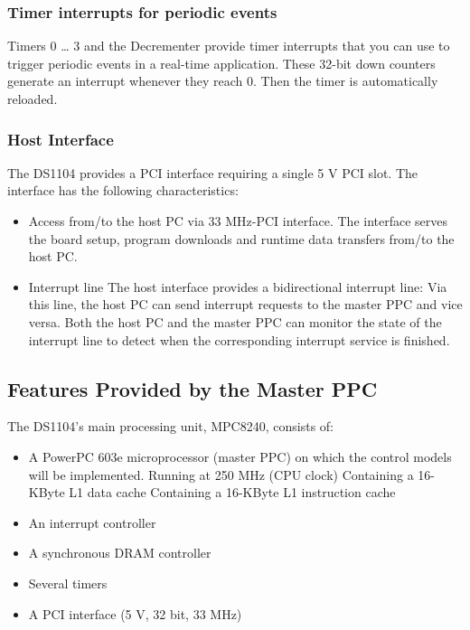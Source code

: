

\subsubsection {Timer interrupts for periodic events}
Timers 0 … 3 and the Decrementer provide timer interrupts that you can use to trigger periodic events in a real-time application. These 32-bit down counters generate an interrupt whenever they reach 0. Then the timer is automatically reloaded.

\subsubsection{Host Interface}
The DS1104 provides a PCI interface requiring a single 5 V PCI slot. The interface has the following characteristics:
\begin{itemize}
    \item Access from/to the host PC via 33 MHz-PCI interface.\newline
    The interface serves the board setup, program downloads and runtime data transfers from/to the host PC.
    \item Interrupt line\newline
The host interface provides a bidirectional interrupt line: Via this line, the host PC can send interrupt requests to the master PPC and vice versa. Both the host PC and the master PPC can monitor the state of the interrupt line to detect when the corresponding interrupt service is finished.
\end{itemize}
\subsection{Features Provided by the Master PPC}
The DS1104’s main processing unit, MPC8240, consists of:

\begin{itemize}
    \item A PowerPC 603e microprocessor (master PPC) on which the control models will be implemented.
    \subitem Running at 250 MHz (CPU clock)
    \subitem Containing a 16-KByte L1 data cache
    \subitem Containing a 16-KByte L1 instruction cache
    \item An interrupt controller
    \item A synchronous DRAM controller
    \item Several timers
    \item A PCI interface (5 V, 32 bit, 33 MHz)
\end{itemize}

